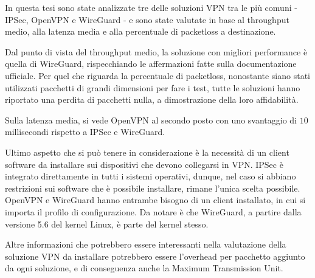 In questa tesi sono state analizzate tre delle soluzioni VPN tra le più comuni - IPSec, OpenVPN e WireGuard - e sono state valutate in base al throughput medio, alla latenza media e alla percentuale di packetloss a destinazione.

Dal punto di vista del throughput medio, la soluzione con migliori performance è quella di WireGuard, rispecchiando le affermazioni fatte sulla documentazione ufficiale.
Per quel che riguarda la percentuale di packetloss, nonostante siano stati utilizzati pacchetti di grandi dimensioni per fare i test, tutte le soluzioni hanno riportato una perdita di pacchetti nulla, a dimostrazione della loro affidabilità.

Sulla latenza media, si vede OpenVPN al secondo posto con uno svantaggio di $10$ millisecondi rispetto a IPSec e WireGuard.

Ultimo aspetto che si può tenere in considerazione è la necessità di un client software da installare sui dispositivi che devono collegarsi in VPN.
IPSec è integrato direttamente in tutti i sistemi operativi, dunque, nel caso si abbiano restrizioni sui software che è possibile installare, rimane l'unica scelta possibile.
OpenVPN e WireGuard hanno entrambe bisogno di un client installato, in cui si importa il profilo di configurazione. Da notare è che WireGuard, a partire dalla versione 5.6 del kernel Linux, è parte del kernel stesso.

Altre informazioni che potrebbero essere interessanti nella valutazione della soluzione VPN da installare potrebbero essere l'overhead per pacchetto aggiunto da ogni soluzione, e di conseguenza anche la Maximum Transmission Unit.
